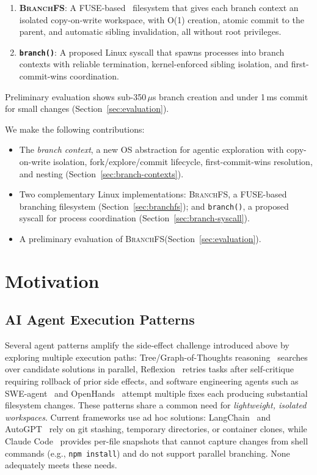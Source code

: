 \documentclass[sigconf]{acmart}
\newcommand{\sys}{\textsc{BranchFS}\xspace}
\newcommand{\syscall}{\texttt{branch()}\xspace}
\begin{document}
\begin{enumerate}
	\item \textbf{\sys}: A FUSE-based~\cite{fuse} filesystem that gives each branch context an isolated copy-on-write workspace, with O(1) creation, atomic commit to the parent, and automatic sibling invalidation, all without root privileges.

	\item \textbf{\syscall}: A proposed Linux syscall that spawns processes into branch contexts with reliable termination, kernel-enforced sibling isolation, and first-commit-wins coordination.
\end{enumerate}

\noindent Preliminary evaluation shows sub-350\,$\mu$s branch creation and under 1\,ms commit for small changes (Section~\ref{sec:evaluation}).

We make the following contributions:
\begin{itemize}
	\item The \emph{branch context}, a new OS abstraction for agentic exploration with copy-on-write isolation, fork/explore/commit lifecycle, first-commit-wins resolution, and nesting (Section~\ref{sec:branch-contexts}).
	\item Two complementary Linux implementations: \sys, a FUSE-based branching filesystem (Section~\ref{sec:branchfs}); and \syscall, a proposed syscall for process coordination (Section~\ref{sec:branch-syscall}).
	\item A preliminary evaluation of \sys (Section~\ref{sec:evaluation}).
\end{itemize}

\section{Motivation}
\label{sec:motivation}

\subsection{AI Agent Execution Patterns}

Several agent patterns amplify the side-effect challenge introduced above by exploring multiple execution paths: Tree/Graph-of-Thoughts reasoning~\cite{tree-of-thoughts,graph-of-thoughts} searches over candidate solutions in parallel, Reflexion~\cite{reflexion} retries tasks after self-critique requiring rollback of prior side effects, and software engineering agents such as SWE-agent~\cite{swe-agent} and OpenHands~\cite{openhands} attempt multiple fixes each producing substantial filesystem changes. These patterns share a common need for \emph{lightweight, isolated workspaces}. Current frameworks use ad hoc solutions: LangChain~\cite{langchain} and AutoGPT~\cite{autogpt} rely on git stashing, temporary directories, or container clones, while Claude Code~\cite{claudecode} provides per-file snapshots that cannot capture changes from shell commands (e.g., \texttt{npm install}) and do not support parallel branching. None adequately meets these needs.
\end{document}
